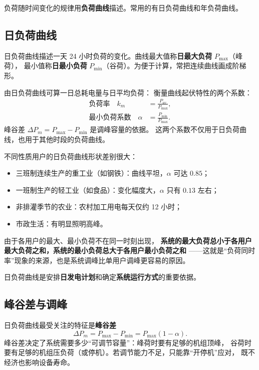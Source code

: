 负荷随时间变化的规律用\textbf{负荷曲线}描述。常用的有日负荷曲线和年负荷曲线。

\subsection{日负荷曲线}

日负荷曲线描述一天 24 小时负荷的变化。曲线最大值称\textbf{日最大负荷} $P_{\max}$（峰荷），
最小值称\textbf{日最小负荷} $P_{\min}$（谷荷）。为便于计算，常把连续曲线画成阶梯形。

由日负荷曲线可算一日总耗电量与日平均负荷：
衡量曲线起伏特性的两个系数：
\begin{align}
  \text{负荷率}\quad k_m&=\frac{P_{av}}{P_{\max}},\\
  \text{最小负荷系数}\quad \alpha&=\frac{P_{\min}}{P_{\max}}.
\end{align}
峰谷差 $\Delta P_m=P_{\max}-P_{\min}$ 是调峰容量的依据。
这两个系数不仅用于日负荷曲线，也用于其他时段的负荷曲线。

不同性质用户的日负荷曲线形状差别很大：
\begin{itemize}
  \item 三班制连续生产的重工业（如钢铁）：曲线平坦，$\alpha$ 可达 $0.85$；
  \item 一班制生产的轻工业（如食品）：变化幅度大，$\alpha$ 只有 $0.13$ 左右；
  \item 非排灌季节的农业：农村加工用电每天仅约 12 小时；
  \item 市政生活：有明显照明高峰。
\end{itemize}
由于各用户的最大、最小负荷不在同一时刻出现，
\textbf{系统的最大负荷总小于各用户最大负荷之和，系统的最小负荷总大于各用户最小负荷之和}
——这就是“负荷同时率”现象的来源，也是系统调峰比单用户调峰更容易的原因。

日负荷曲线是安排\textbf{日发电计划}和确定\textbf{系统运行方式}的重要依据。

\subsection{峰谷差与调峰}

日负荷曲线最受关注的特征是\textbf{峰谷差}
\begin{equation}
  \Delta P_m=P_{\max}-P_{\min}=P_{\max}\left(1-\alpha\right).
\end{equation}
峰谷差决定了系统需要多少“可调节容量”：峰荷时要有足够的机组顶峰，
谷荷时要有足够的机组压负荷（或停机）。若调节能力不足，只能靠“开停机”应对，
既不经济也影响设备寿命。

